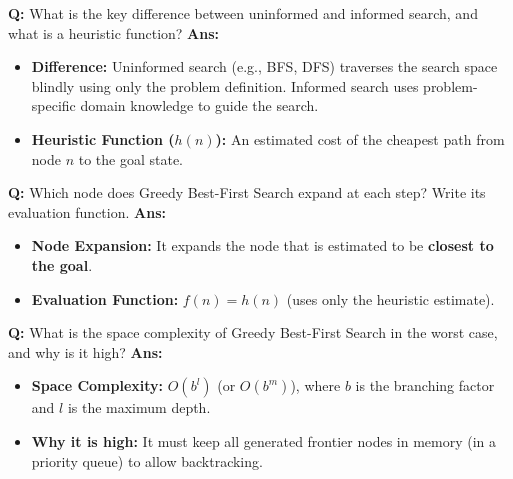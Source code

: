 \documentclass[10pt,a4paper,twocolumn]{article}
\begin{document}
\begin{tcolorbox}[
  colback=white,
  colframe=UnitColorFour,
  colbacktitle=gray!10!white,
  coltitle=black,
  fonttitle=\bfseries\sffamily\small,
  title={Unit IV $\bullet$ Card 9: Informed Search \& Heuristics (Q4.7)},
  boxrule=1.2pt,
  arc=2mm,
  outer arc=2mm,
  boxsep=1.5mm,
  top=1mm,
  bottom=1mm,
  left=1.5mm,
  right=1.5mm,
  before skip=2.5mm,
  after skip=2.5mm
]
\textbf{Q:} What is the key difference between uninformed and informed search, and what is a heuristic function?
\tcbline
\textbf{Ans:} \begin{itemize}
  \item   \textbf{Difference:} Uninformed search (e.g., BFS, DFS) traverses the search space blindly using only the problem definition. Informed search uses problem-specific domain knowledge to guide the search.
  \item   \textbf{Heuristic Function ($h(n)$):} An estimated cost of the cheapest path from node $n$ to the goal state.
\end{itemize}
\end{tcolorbox}


\begin{tcolorbox}[
  colback=white,
  colframe=UnitColorFour,
  colbacktitle=gray!10!white,
  coltitle=black,
  fonttitle=\bfseries\sffamily\small,
  title={Unit IV $\bullet$ Card 10: Greedy Best-First Search Node Expansion (Q4.7)},
  boxrule=1.2pt,
  arc=2mm,
  outer arc=2mm,
  boxsep=1.5mm,
  top=1mm,
  bottom=1mm,
  left=1.5mm,
  right=1.5mm,
  before skip=2.5mm,
  after skip=2.5mm
]
\textbf{Q:} Which node does Greedy Best-First Search expand at each step? Write its evaluation function.
\tcbline
\textbf{Ans:} \begin{itemize}
  \item   \textbf{Node Expansion:} It expands the node that is estimated to be \textbf{closest to the goal}.
  \item   \textbf{Evaluation Function:} $f(n) = h(n)$ (uses only the heuristic estimate).
\end{itemize}
\end{tcolorbox}


\begin{tcolorbox}[
  colback=white,
  colframe=UnitColorFour,
  colbacktitle=gray!10!white,
  coltitle=black,
  fonttitle=\bfseries\sffamily\small,
  title={Unit IV $\bullet$ Card 11: Space Complexity of Greedy Search (Q4.7)},
  boxrule=1.2pt,
  arc=2mm,
  outer arc=2mm,
  boxsep=1.5mm,
  top=1mm,
  bottom=1mm,
  left=1.5mm,
  right=1.5mm,
  before skip=2.5mm,
  after skip=2.5mm
]
\textbf{Q:} What is the space complexity of Greedy Best-First Search in the worst case, and why is it high?
\tcbline
\textbf{Ans:} \begin{itemize}
  \item   \textbf{Space Complexity:} $O(b^l)$ (or $O(b^m)$), where $b$ is the branching factor and $l$ is the maximum depth.
  \item   \textbf{Why it is high:} It must keep all generated frontier nodes in memory (in a priority queue) to allow backtracking.
\end{itemize}
\end{tcolorbox}
\end{document}

